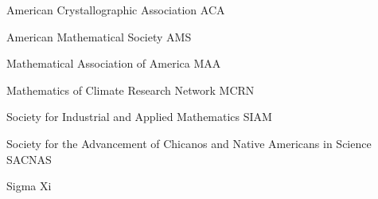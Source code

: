 

\begin{cvhonors}

  \cvhonor
    {American Crystallographic Association} %
    {ACA} %
    {} %
    {} %

\cvhonor
  {American Mathematical Society} %
  {AMS} %
  {} %
  {} %
  
\cvhonor
    {Mathematical Association of America} %
    {MAA} %
    {} %
    {} %
    
    
\cvhonor
    {Mathematics of Climate Research Network} %
    {MCRN} %
    {} %
    {} %
    
    
\cvhonor
    {Society for Industrial and Applied Mathematics} %
    {SIAM} %
    {} %
    {} %
    
    
\cvhonor
    {Society for the Advancement of Chicanos and Native Americans in Science} %
    {SACNAS} %
    {} %
    {} %
    
    
    \cvhonor
    {Sigma Xi} %
    {} %
    {} %
    {} %
    
\end{cvhonors}
